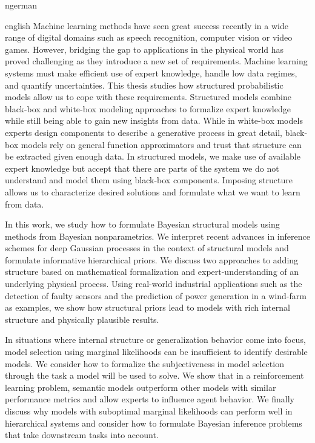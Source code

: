 \begin{titlepage}
    
\end{titlepage}

\begin{titlepage}
    
\end{titlepage}

\begin{Abstract}{ngerman}
\end{Abstract}

\begin{Abstract}{english}
    Machine learning methods have seen great success recently in a wide range of digital domains such as speech recognition, computer vision or video games.
    However, bridging the gap to applications in the physical world has proved challenging as they introduce a new set of requirements.
    Machine learning systems must make efficient use of expert knowledge, handle low data regimes, and quantify uncertainties.
    This thesis studies how structured probabilistic models allow us to cope with these requirements.
    Structured models combine black-box and white-box modeling approaches to formalize expert knowledge while still being able to gain new insights from data.
    While in white-box models experts design components to describe a generative process in great detail, black-box models rely on general function approximators and trust that structure can be extracted given enough data.
    In structured models, we make use of available expert knowledge but accept that there are parts of the system we do not understand and model them using black-box components.
    Imposing structure allows us to characterize desired solutions and formulate what we want to learn from data.

    In this work, we study how to formulate Bayesian structural models using methods from Bayesian nonparametrics.
    We interpret recent advances in inference schemes for deep Gaussian processes in the context of structural models and formulate informative hierarchical priors.
    We discuss two approaches to adding structure based on mathematical formalization and expert-understanding of an underlying physical process.
    Using real-world industrial applications such as the detection of faulty sensors and the prediction of power generation in a wind-farm as examples, we show how structural priors lead to models with rich internal structure and physically plausible results.

    In situations where internal structure or generalization behavior come into focus, model selection using marginal likelihoods can be insufficient to identify desirable models.
    We consider how to formalize the subjectiveness in model selection through the task a model will be used to solve.
    We show that in a reinforcement learning problem, semantic models outperform other models with similar performance metrics and allow experts to influence agent behavior.
    We finally discuss why models with suboptimal marginal likelihoods can perform well in hierarchical systems and consider how to formulate Bayesian inference problems that take downstream tasks into account.
\end{Abstract}

